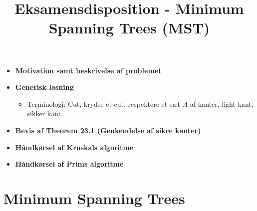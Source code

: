 
\title{Eksamensdisposition - Minimum Spanning Trees (MST)}

\maketitle



\begin{itemize}
\item \textbf{Motivation samt beskrivelse af problemet}


\item \textbf{Generisk løsning}
\begin{itemize}
	\item Terminologi: Cut, krydse et cut, respektere et sæt $A$ af kanter, light kant, sikker kant.
\end{itemize}

\item \textbf{Bevis af Theorem 23.1 (Genkendelse af sikre kanter)}

\item \textbf{Håndkørsel af Kruskals algoritme}

\item \textbf{Håndkørsel af Prims algoritme}


\end{itemize}

\newpage
\section{Minimum Spanning Trees}



